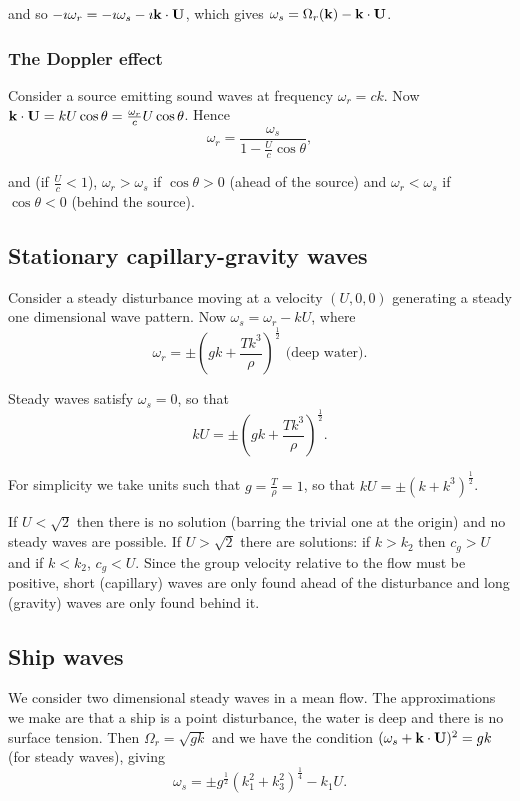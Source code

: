 \documentclass{notes}
\newcommand{\vk}{\vect{k}}
\begin{document}
and so $- \imath \omega_r = - \imath \omega_s - \imath \vk \cdot \vect U$,
which gives $\omega_s = \Omega_r(\vk) - \vk \cdot \vect{U}$.

\subsubsection*{The Doppler effect}

\vspace{1in}

Consider a source emitting sound waves at frequency $\omega_r = c k$.
Now $\vk \cdot \vect U = k U \cos \theta = \frac{\omega_r}{c} U \cos
\theta$.  Hence
\[
\omega_r = \frac{\omega_s}{1 - \frac{U}{c} \cos \theta},
\]

and (if $\tfrac{U}{c} < 1$), $\omega_r > \omega_s$ if $\cos \theta >
0$ (ahead of the source) and $\omega_r < \omega_s$ if $\cos \theta <
0$ (behind the source).

\subsection{Stationary capillary-gravity waves}

Consider a steady disturbance moving at a velocity $(U,0,0)$
generating a steady one dimensional wave pattern.  Now
$\omega_s = \omega_r - k U$, where
\[
\omega_r = \pm \left( g k + \frac{T k^3}{\rho} \right)^{\frac{1}{2}}
\text{ (deep water).}
\]

Steady waves satisfy $\omega_s = 0$, so that
\[
k U = \pm \left( g k + \frac{T k^3}{\rho} \right)^{\frac{1}{2}}.
\]

For simplicity we take units such that $g = \tfrac{T}{\rho} = 1$, so
that $k U = \pm \left( k + k^3 \right)^{\frac{1}{2}}$.

\vspace{2in}

If $U < \sqrt{2}$ then there is no solution (barring the trivial one
at the origin) and no steady waves are possible.  If $U > \sqrt{2}$
there are solutions: if $k > k_2$ then $c_g > U$ and if $k < k_2$,
$c_g < U$.  Since the group velocity relative to the flow must be
positive, short (capillary) waves are only found ahead of the
disturbance and long (gravity) waves are only found behind it.

\subsection{Ship waves}

We consider two dimensional steady waves in a mean flow.
The approximations we make are that a ship is a point disturbance, the
water is deep and there is no surface tension.  Then $\Omega_r =
\sqrt{g k}$ and we have the condition
$( \omega_s + \vk \cdot \vect U)^2 = gk$ (for steady waves), giving
\begin{equation}\label{eq:shipdisp}
\omega_s = \pm g^{\frac{1}{2}} \left( k_1^2 + k_3^2
\right)^{\frac{1}{4}} - k_1 U.
\end{equation}
\end{document}
